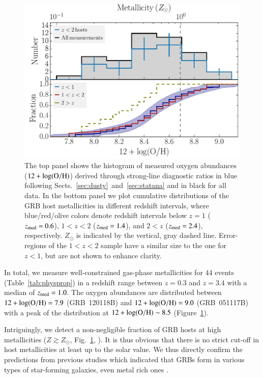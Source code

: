 \documentclass[traditabstract, longauth]{aa}
\newcommand{\oh}{12+\log(\rm{O/H})}
\begin{document}
\begin{figure}
\includegraphics[angle=0, width=0.99\columnwidth]{Figs/Z_histogram.pdf}
\caption{The top panel shows the histogram of measured oxygen abundances ($\oh$) derived through strong-line diagnostic ratios in blue following Sects.~\ref{sec:dusty}~and~\ref{sec:statana} and in black for all data. In the bottom panel we plot cumulative distributions of the GRB host metallicities in different redshift intervals, where blue/red/olive colors denote redshift intervals below $z=1$ ($z_{\rm{med}}=0.6$), $1<z<2$ ($z_{\rm{med}}=1.4$), and $2<z$ ($z_{\rm{med}}=2.4$), respectively. $Z_{\odot}$ is indicated by the vertical, gray dashed line. Error-regions of the $1<z<2$ sample have a similar size to the one for $z<1$, but are not shown to enhance clarity.}
\label{fig:zhist}
\end{figure}

In total, we measure well-constrained gas-phase metallicities for 44 events (Table~\ref{tab:physprop}) in a redshift range between $z=0.3$ and $z=3.4$ with a median of $z_{\rm {med}}=1.0$. The oxygen abundances are distributed between $\oh=7.9$ (GRB~120118B) and $\oh=9.0$ (GRB~051117B) with a peak of the distribution at $\oh \sim 8.5$ (Figure~\ref{fig:zhist}). 

Intriguingly, we detect a non-negligible fraction of GRB hosts at high metallicities ($Z\gtrsim Z_{\odot}$, Fig.~\ref{fig:zhist}, \citealp[see also][]{2010ApJ...712L..26L, 2013A&A...556A..23E}). It is thus obvious that there is no strict cut-off in host metallicities at least up to the solar value. We thus directly confirm the predictions from previous studies which indicated that GRBs form in various types of star-forming galaxies, even metal rich ones \citep{2007ApJ...660..504B, 2011A&A...534A.108K, 2013ApJ...778..128P, 2015arXiv150402479P}.
\end{document}
